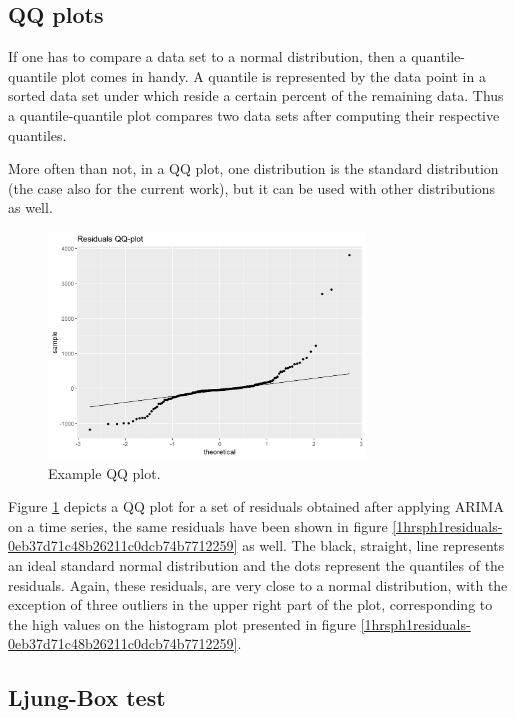 \documentclass[12pt,a4paper,titlepage]{report}
\begin{document}
\subsection{QQ plots}

If one has to compare a data set to a normal distribution, then a quantile-quantile plot comes in handy. A quantile is represented by the data point in a sorted data set under which reside a certain percent of the remaining data. Thus a quantile-quantile plot compares two data sets after computing their respective quantiles.

More often than not, in a QQ plot, one distribution is the standard distribution (the case also for the current work), but it can be used with other distributions as well. \cite{qqplots}

\begin{figure}[h]
    \centering
    \includegraphics[width=0.75\textwidth]{d1hrsph1residualsqq-0eb37d71c48b26211c0dcb74b7712259}
    \caption{Example QQ plot.}
    \label{1hrsph1residualsqq-0eb37d71c48b26211c0dcb74b7712259}
\end{figure}

Figure \ref{1hrsph1residualsqq-0eb37d71c48b26211c0dcb74b7712259} depicts a QQ plot for a set of residuals obtained after applying ARIMA on a time series, the same residuals have been shown in figure \ref{1hrsph1residuals-0eb37d71c48b26211c0dcb74b7712259} as well. The black, straight, line represents an ideal standard normal distribution and the dots represent the quantiles of the residuals. Again, these residuals, are very close to a normal distribution, with the exception of three outliers in the upper right part of the plot, corresponding to the high values on the histogram plot presented in figure \ref{1hrsph1residuals-0eb37d71c48b26211c0dcb74b7712259}.

\subsection{Ljung-Box test} \label{ljungboxsection}
\end{document}
